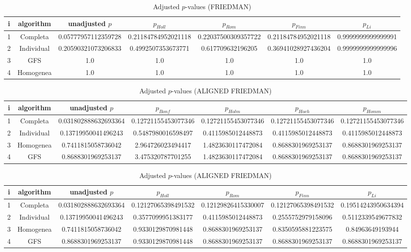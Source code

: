 \documentclass[a4paper,10pt]{article}
\begin{document}
\begin{landscape}
\begin{table}[!htp]
\centering\scriptsize
\caption{Adjusted $p$-values (FRIEDMAN)}
\begin{tabular}{ccccccc}
i&algorithm&unadjusted $p$&$p_{Holl}$&$p_{Rom}$&$p_{Finn}$&$p_{Li}$\\
\hline
1&Completa&0.05777957112359728&0.21184784952021118&0.22037500309357722&0.21184784952021118&0.9999999999999991\\
2&Individual&0.20590321073206833&0.4992507353673771&0.617709632196205&0.36941028927436204&0.9999999999999996\\
3&GFS&1.0&1.0&1.0&1.0&1.0\\
4&Homogenea&1.0&1.0&1.0&1.0&1.0\\
\hline
\end{tabular}
\end{table}


\newpage

\begin{table}[!htp]
\centering\scriptsize
\caption{Adjusted $p$-values (ALIGNED FRIEDMAN)}
\begin{tabular}{ccccccc}
i&algorithm&unadjusted $p$&$p_{Bonf}$&$p_{Holm}$&$p_{Hoch}$&$p_{Homm}$\\
\hline
1&Completa&0.031802888632693364&0.12721155453077346&0.12721155453077346&0.12721155453077346&0.12721155453077346\\
2&Individual&0.13719950041496243&0.5487980016598497&0.4115985012448873&0.4115985012448873&0.4115985012448873\\
3&Homogenea&0.7411815058736042&2.964726023494417&1.4823630117472084&0.8688301969253137&0.8688301969253137\\
4&GFS&0.8688301969253137&3.475320787701255&1.4823630117472084&0.8688301969253137&0.8688301969253137\\
\hline
\end{tabular}
\end{table}

\begin{table}[!htp]
\centering\scriptsize
\caption{Adjusted $p$-values (ALIGNED FRIEDMAN)}
\begin{tabular}{ccccccc}
i&algorithm&unadjusted $p$&$p_{Holl}$&$p_{Rom}$&$p_{Finn}$&$p_{Li}$\\
\hline
1&Completa&0.031802888632693364&0.12127065398491532&0.12129826415330007&0.12127065398491532&0.19514243950634394\\
2&Individual&0.13719950041496243&0.3577099951383177&0.4115985012448873&0.2555752979158096&0.5112339549677832\\
3&Homogenea&0.7411815058736042&0.9330129870981448&0.8688301969253137&0.8350595881223575&0.84963649193944\\
4&GFS&0.8688301969253137&0.9330129870981448&0.8688301969253137&0.8688301969253137&0.8688301969253137\\
\hline
\end{tabular}
\end{table}



\end{landscape}
\end{document}
